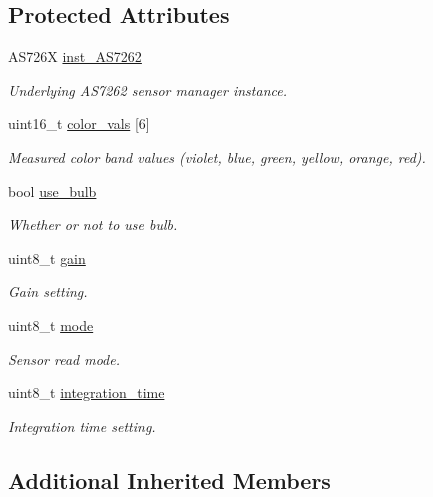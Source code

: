 \subsection*{Protected Attributes}
\begin{DoxyCompactItemize}
\item 
A\+S726X \hyperlink{class_loom___a_s7262_a601df5126c5cf248fa51dace2596aa2f}{inst\+\_\+\+A\+S7262}
\begin{DoxyCompactList}\small\item\em Underlying A\+S7262 sensor manager instance. \end{DoxyCompactList}\item 
uint16\+\_\+t \hyperlink{class_loom___a_s7262_a951df5e3e0154cc32f79b3d4156109b7}{color\+\_\+vals} \mbox{[}6\mbox{]}
\begin{DoxyCompactList}\small\item\em Measured color band values (violet, blue, green, yellow, orange, red). \end{DoxyCompactList}\item 
bool \hyperlink{class_loom___a_s7262_a2fa9b5aeb99ac06738a52c3716053a89}{use\+\_\+bulb}
\begin{DoxyCompactList}\small\item\em Whether or not to use bulb. \end{DoxyCompactList}\item 
uint8\+\_\+t \hyperlink{class_loom___a_s7262_a3a9fc889a169e21181fa703ea152147d}{gain}
\begin{DoxyCompactList}\small\item\em Gain setting. \end{DoxyCompactList}\item 
uint8\+\_\+t \hyperlink{class_loom___a_s7262_afae9fa2dc1e8bac95947f957449212f2}{mode}
\begin{DoxyCompactList}\small\item\em Sensor read mode. \end{DoxyCompactList}\item 
uint8\+\_\+t \hyperlink{class_loom___a_s7262_aa8b8b093c0eabd30a7534270accae5c0}{integration\+\_\+time}
\begin{DoxyCompactList}\small\item\em Integration time setting. \end{DoxyCompactList}\end{DoxyCompactItemize}
\subsection*{Additional Inherited Members}



